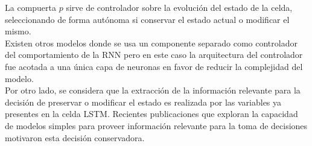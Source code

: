 \documentclass{article}
\begin{document}
	La compuerta $p$ sirve de controlador sobre la evolución del estado de la celda, seleccionando de forma autónoma si conservar el estado actual o modificar el mismo.\\
	Existen otros modelos donde se usa un componente separado como controlador del comportamiento de la RNN\cite{18DifferentiableNeuralComputer} \cite{30NeuralTuringMachines}\cite{31NeuralTuringMachinesRevised} pero en este caso la arquitectura del controlador fue acotada a una única capa de neuronas en favor de reducir la complejidad del modelo. \\
	Por otro lado, se considera que la extracción de la información relevante para la decisión de preservar o modificar el estado es realizada por las variables ya presentes en la celda LSTM. Recientes publicaciones que exploran la capacidad de modelos simples para proveer información relevante para la toma de decisiones motivaron esta decisión conservadora\cite{32WideDeepLearning}.\\
	
\end{document}
